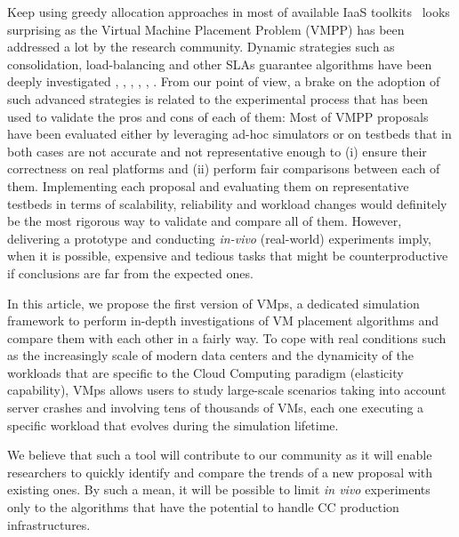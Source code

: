 \documentclass[conference]{IEEEtran}
\newcommand{\vmps}{VMps\xspace}
\begin{document}
Keep using  greedy allocation approaches in most of available IaaS
toolkits~\cite{openstack, opennebula, cloudstack} looks surprising
as the Virtual Machine Placement Problem (VMPP) has been addressed a
lot by the research community. Dynamic strategies such as
consolidation,  load-balancing and other SLAs guarantee algorithms
have been deeply investigated
\cite{Hermenier:2009:ECM:1508293.1508300}, \cite{feller:ccgrid12},
\cite{quesnel:cpe2012},
\cite{5935254}, \cite{5715067}, \cite{5328077}.
From our point of view, a brake on the adoption of such advanced strategies is
related to the experimental process that has been used to validate the
pros and cons of each of them: Most of VMPP proposals have been
evaluated either by leveraging ad-hoc simulators or on testbeds that
in both cases are not accurate and not representative enough to (i)
ensure their correctness on real platforms and (ii) perform fair
comparisons between each of them.
%
Implementing each proposal and evaluating them on representative
testbeds in terms of scalability, reliability and workload changes
would definitely be the most rigorous way to validate and compare all
of them. However, delivering a prototype and conducting
\textit{in-vivo} (\ie real-world) experiments imply, when it is
possible, expensive and tedious tasks that might be counterproductive
if conclusions are far from the expected ones.
%

In this article, we propose the first version of \vmps, a dedicated
simulation framework to perform in-depth investigations of VM placement
algorithms and compare them with each other in a fairly way. To cope with
real conditions such as the increasingly scale of modern data
centers and the dynamicity of the workloads that are specific to the
Cloud Computing paradigm (\ie elasticity capability), \vmps
allows users to study large-scale scenarios taking into account server
crashes and involving tens of thousands of VMs, each one executing a
specific workload that evolves during the simulation lifetime.

We believe that such a tool will contribute to
our community as it will enable researchers to quickly identify and
compare the trends of a new proposal with existing ones. By such a
mean, it will be possible to limit \textit{in vivo} experiments only
to the algorithms that have the potential to handle CC
production infrastructures.
\end{document}

